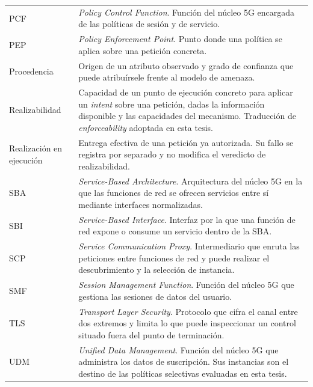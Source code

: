 \begin{singlespace}
\begin{longtable}{@{}>{\raggedright\arraybackslash}p{}>{\raggedright\arraybackslash}p{}@{}}
    PCF & \textit{Policy Control Function}. Función del núcleo 5G encargada de las políticas de sesión y de servicio. \\

    PEP & \textit{Policy Enforcement Point}. Punto donde una política se aplica sobre una petición concreta. \\

    Procedencia & Origen de un atributo observado y grado de confianza que puede atribuírsele frente al modelo de amenaza. \\

    Realizabilidad & Capacidad de un punto de ejecución concreto para aplicar un \textit{intent} sobre una petición, dadas la información disponible y las capacidades del mecanismo. Traducción de \textit{enforceability} adoptada en esta tesis. \\

    Realización en ejecución & Entrega efectiva de una petición ya autorizada. Su fallo se registra por separado y no modifica el veredicto de realizabilidad. \\

    SBA & \textit{Service-Based Architecture}. Arquitectura del núcleo 5G en la que las funciones de red se ofrecen servicios entre sí mediante interfaces normalizadas. \\

    SBI & \textit{Service-Based Interface}. Interfaz por la que una función de red expone o consume un servicio dentro de la SBA. \\

    SCP & \textit{Service Communication Proxy}. Intermediario que enruta las peticiones entre funciones de red y puede realizar el descubrimiento y la selección de instancia. \\

    SMF & \textit{Session Management Function}. Función del núcleo 5G que gestiona las sesiones de datos del usuario. \\

    TLS & \textit{Transport Layer Security}. Protocolo que cifra el canal entre dos extremos y limita lo que puede inspeccionar un control situado fuera del punto de terminación. \\

    UDM & \textit{Unified Data Management}. Función del núcleo 5G que administra los datos de suscripción. Sus instancias son el destino de las políticas selectivas evaluadas en esta tesis. \\


\end{longtable}
\end{singlespace}

